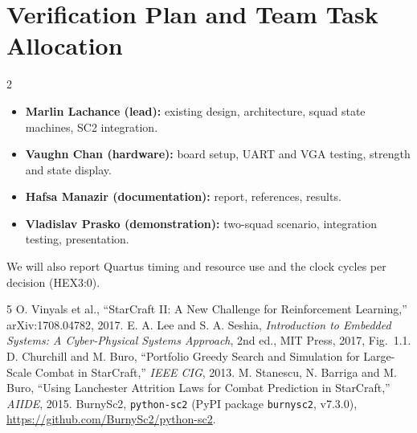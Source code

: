 \documentclass[10pt]{article}
\begin{document}
\section{Verification Plan and Team Task Allocation}
{\small
\setlength{\multicolsep}{1pt}
\begin{multicols}{2}\raggedright
\begin{itemize}
\item \textbf{Marlin Lachance (lead):} existing design, architecture, squad state machines, SC2 integration.
\item \textbf{Vaughn Chan (hardware):} board setup, UART and VGA testing, strength and state display.
\item \textbf{Hafsa Manazir (documentation):} report, references, results.
\item \textbf{Vladislav Prasko (demonstration):} two-squad scenario, integration testing, presentation.
\end{itemize}
\end{multicols}
We will also report Quartus timing and resource use and the clock cycles per decision (HEX3:0).
}

\vspace{-3pt}
{\scriptsize
\renewcommand{\section}[2]{}%
\begin{thebibliography}{5}
\setlength{\itemsep}{-2pt}
 O. Vinyals et al., ``StarCraft II: A New Challenge for Reinforcement Learning,'' arXiv:1708.04782, 2017.
 E. A. Lee and S. A. Seshia, \textit{Introduction to Embedded Systems: A Cyber-Physical Systems Approach}, 2nd ed., MIT Press, 2017, Fig.~1.1.
 D. Churchill and M. Buro, ``Portfolio Greedy Search and Simulation for Large-Scale Combat in StarCraft,'' \textit{IEEE CIG}, 2013.
 M. Stanescu, N. Barriga and M. Buro, ``Using Lanchester Attrition Laws for Combat Prediction in StarCraft,'' \textit{AIIDE}, 2015.
 BurnySc2, \texttt{python-sc2} (PyPI package \texttt{burnysc2}, v7.3.0), \url{https://github.com/BurnySc2/python-sc2}.
\end{thebibliography}
}
\end{document}
